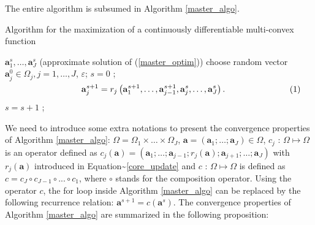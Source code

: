 \documentclass[
]{jss}
\begin{document}
The entire algorithm is subsumed in Algorithm \ref{master_algo}.

\begin{algorithm}[!ht]
    \caption{Algorithm for the maximization of a continuously differentiable multi-convex function}
    \begin{algorithmic}[1]
         {$\mathbf a_1^s, \ldots,  \mathbf a_J^s$ (approximate solution of (\ref{master_optim}))}
         {choose random vector $\mathbf a_j^0\in\Omega_j, j =1, \ldots, J$, $\varepsilon$;}
        \STATE$s = 0$ ;
        \REPEAT
        \STATE \hspace{-2cm}$\vcenter{\begin{equation}
             \mathbf a_j^{s+1} = r_j\left(  \mathbf a_1^{s+1}, \ldots,  \mathbf a_{j-1}^{s+1},  \mathbf a_j^{s}, \ldots,  \mathbf a_J^{s}\right).
        \end{equation}}$
        \ENDFOR
        \STATE$s = s + 1$ ;
    \end{algorithmic}
    \label{master_algo}
\end{algorithm}

We need to introduce some extra notations to present the convergence
properties of Algorithm \ref{master_algo}:
\(\Omega = \Omega_1 \times \ldots \times \Omega_J\),
\(\mathbf a = \left( \mathbf a_1; \ldots; \mathbf a_J\right) \in \Omega\),
\(c_j \text{ : } \Omega\mapsto\Omega\) is an operator defined as
\(c_j( \mathbf a) = \left( \mathbf a_1; \ldots;  \mathbf a_{j-1} ; r_j( \mathbf a) ;  \mathbf a_{j+1} ; \ldots;  \mathbf a_J\right)\)
with \(r_j( \mathbf a)\) introduced in
Equation\textasciitilde{}\ref{core_update} and
\(c \text{ : } \Omega\mapsto\Omega\) is defined as
\(c = c_J\circ c_{J-1}\circ ... \circ c_1\), where \(\circ\) stands for
the composition operator. Using the operator \(c\), the
\guillemotleft for loop\guillemotright{} inside Algorithm
\ref{master_algo} can be replaced by the following recurrence relation:
\(\mathbf a^{s+1} = c( \mathbf a^s)\). The convergence properties of
Algorithm \ref{master_algo} are summarized in the following proposition:
\end{document}
